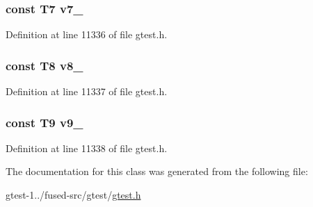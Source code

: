 \hypertarget{classtesting_1_1internal_1_1ValueArray22_a4063f0b7a528133d018ee488ba44a9a3}{
\subsubsection[{v7\-\_\-}]{\setlength{\rightskip}{0pt plus 5cm}const \-T7 {\bf v7\-\_\-}}}\label{dd/dff/classtesting_1_1internal_1_1ValueArray22_a4063f0b7a528133d018ee488ba44a9a3}


\-Definition at line 11336 of file gtest.\-h.

\hypertarget{classtesting_1_1internal_1_1ValueArray22_a596bc5260b2474271d1f6910ff6f665d}{
\subsubsection[{v8\-\_\-}]{\setlength{\rightskip}{0pt plus 5cm}const \-T8 {\bf v8\-\_\-}}}\label{dd/dff/classtesting_1_1internal_1_1ValueArray22_a596bc5260b2474271d1f6910ff6f665d}


\-Definition at line 11337 of file gtest.\-h.

\hypertarget{classtesting_1_1internal_1_1ValueArray22_a6356e16cf54a9dfac8525f20242af31e}{
\subsubsection[{v9\-\_\-}]{\setlength{\rightskip}{0pt plus 5cm}const \-T9 {\bf v9\-\_\-}}}\label{dd/dff/classtesting_1_1internal_1_1ValueArray22_a6356e16cf54a9dfac8525f20242af31e}


\-Definition at line 11338 of file gtest.\-h.



\-The documentation for this class was generated from the following file\-:\begin{DoxyCompactItemize}
\item 
gtest-\/1../fused-\/src/gtest/\hyperlink{fused-src_2gtest_2gtest_8h}{gtest.\-h}\end{DoxyCompactItemize}
